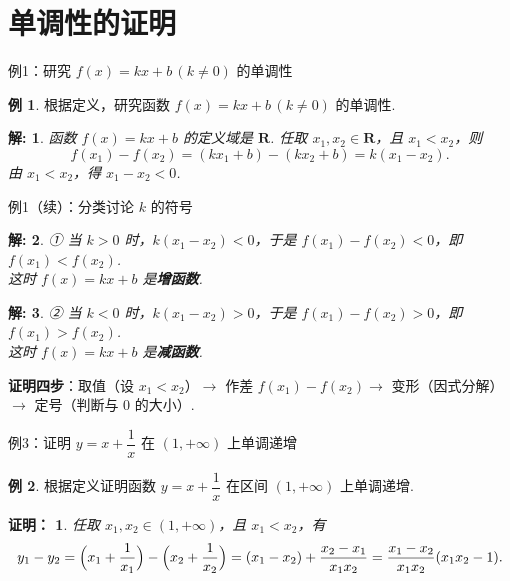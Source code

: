 \documentclass[aspectratio=169,13pt,t] {beamer}
\newtheorem{prooft}{证明：}
\newtheorem*{solve}{解:}
\theoremstyle{definition}
\newtheorem{exam}{例}
\begin{document}
\section{单调性的证明}

\begin{frame}{例1：研究 \(f(x)=kx+b\,(k\neq 0)\) 的单调性}
	\begin{exam}
	根据定义，研究函数 \(f(x)=kx+b\,(k\neq 0)\) 的单调性.
	\end{exam}
	\pause
	\begin{solve}
	函数 \(f(x)=kx+b\) 的定义域是 \(\mathbf{R}\). 任取 \(x_1,x_2\in\mathbf{R}\)，且 \(x_1<x_2\)，则
	\[
		f(x_1)-f(x_2)=(kx_1+b)-(kx_2+b)=k(x_1-x_2).
	\]
	由 \(x_1<x_2\)，得 \(x_1-x_2<0\).
	\end{solve}
\end{frame}

\begin{frame}{例1（续）：分类讨论 \(k\) 的符号}
	\begin{solve}
	① 当 \(k>0\) 时，\(k(x_1-x_2)<0\)，于是 \(f(x_1)-f(x_2)<0\)，即 \(f(x_1)<f(x_2)\).\\
	\quad 这时 \(f(x)=kx+b\) 是\textbf{增函数}.
	\end{solve}
	\vspace{0.5em}
	\pause
	\begin{solve}
	② 当 \(k<0\) 时，\(k(x_1-x_2)>0\)，于是 \(f(x_1)-f(x_2)>0\)，即 \(f(x_1)>f(x_2)\).\\
	\quad 这时 \(f(x)=kx+b\) 是\textbf{减函数}.
	\end{solve}
	\vspace{0.5em}
	\begin{summarybox-answer}
	\textbf{证明四步}：取值（设 \(x_1<x_2\)）\(\to\) 作差 \(f(x_1)-f(x_2)\)\(\to\) 变形（因式分解）\(\to\) 定号（判断与 \(0\) 的大小）.
	\end{summarybox-answer}
\end{frame}

\begin{frame}{例3：证明 \(y=x+\dfrac{1}{x}\) 在 \((1,+\infty)\) 上单调递增}
	\begin{exam}
	根据定义证明函数 \(y=x+\dfrac{1}{x}\) 在区间 \((1,+\infty)\) 上单调递增.
	\end{exam}
	\pause
	\begin{prooft}
	任取 \(x_1,x_2\in(1,+\infty)\)，且 \(x_1<x_2\)，有
	\[
		y_1-y_2=\Bigl(x_1+\frac{1}{x_1}\Bigr)-\Bigl(x_2+\frac{1}{x_2}\Bigr)
		=(x_1-x_2)+\frac{x_2-x_1}{x_1x_2}
		=\frac{x_1-x_2}{x_1x_2}(x_1x_2-1).
	\]
	\end{prooft}
\end{frame}
\end{document}
